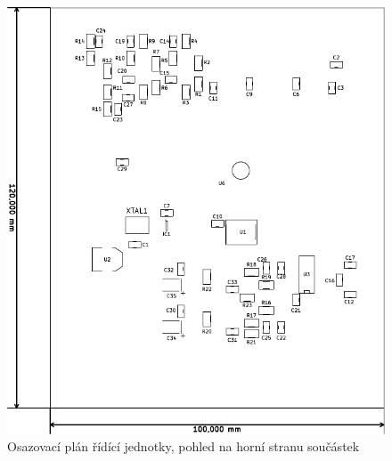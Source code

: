 \begin{figure}[H]
	\centering
	\includegraphics[width=170mm]{img/mix/os_b.pdf}
	\caption{Osazovací plán řídící jednotky, pohled na horní stranu součástek}    		
\end{figure}

